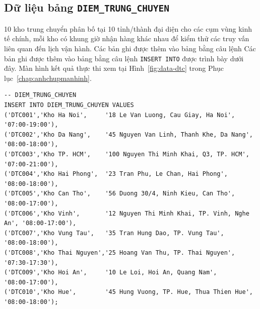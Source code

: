 \documentclass[11pt]{report}
\begin{document}

\subsection{Dữ liệu bảng \texttt{DIEM\_TRUNG\_CHUYEN}}

10 kho trung chuyển phân bố tại 10 tỉnh/thành đại diện cho các cụm vùng kinh tế chính, mỗi kho có khung giờ nhận hàng khác nhau để kiểm thử các truy vấn liên quan đến lịch vận hành. Các bản ghi được thêm vào bảng bằng câu lệnh Các bản ghi được thêm vào bảng bằng câu lệnh \texttt{INSERT INTO} được trình bày dưới đây. Màn hình kết quả thực thi xem tại Hình~\ref{fig:data-dtc} trong Phục lục~\ref{chap:anhchupmanhinh}.

\begin{verbatim}
-- DIEM_TRUNG_CHUYEN
INSERT INTO DIEM_TRUNG_CHUYEN VALUES
('DTC001','Kho Ha Noi',     '18 Le Van Luong, Cau Giay, Ha Noi',          '07:00-19:00'),
('DTC002','Kho Da Nang',    '45 Nguyen Van Linh, Thanh Khe, Da Nang',     '08:00-18:00'),
('DTC003','Kho TP. HCM',    '100 Nguyen Thi Minh Khai, Q3, TP. HCM',      '07:00-21:00'),
('DTC004','Kho Hai Phong',  '23 Tran Phu, Le Chan, Hai Phong',            '08:00-18:00'),
('DTC005','Kho Can Tho',    '56 Duong 30/4, Ninh Kieu, Can Tho',          '08:00-17:00'),
('DTC006','Kho Vinh',       '12 Nguyen Thi Minh Khai, TP. Vinh, Nghe An', '08:00-17:00'),
('DTC007','Kho Vung Tau',   '35 Tran Hung Dao, TP. Vung Tau',             '08:00-18:00'),
('DTC008','Kho Thai Nguyen','25 Hoang Van Thu, TP. Thai Nguyen',          '07:30-17:30'),
('DTC009','Kho Hoi An',     '10 Le Loi, Hoi An, Quang Nam',               '08:00-17:00'),
('DTC010','Kho Hue',        '45 Hung Vuong, TP. Hue, Thua Thien Hue',     '08:00-18:00');
\end{verbatim}
\end{document}
